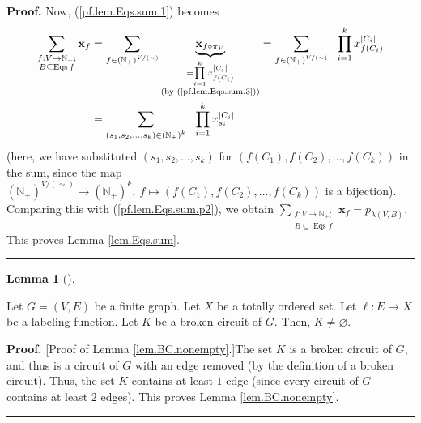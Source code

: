\documentclass[numbers=enddot,12pt,final,onecolumn,notitlepage]{scrartcl}%
\theoremstyle{definition}
\newtheorem{lem}[theo]{Lemma}
\newenvironment{lemma}[1][]
{\begin{lem}[#1]\begin{leftbar}}
{\end{leftbar}\end{lem}}
\newenvironment{proof}[1][Proof]{\noindent\textbf{#1.} }{\ \rule{0.5em}{0.5em}}
\newenvironment{verlong}{}{}
\newenvironment{vershort}{}{}
\let\sumnonlimits\sum
\let\prodnonlimits\prod
\renewcommand{\sum}{\sumnonlimits\limits}
\renewcommand{\prod}{\prodnonlimits\limits}
\begin{document}
\begin{verlong}
\begin{proof}
Now, (\ref{pf.lem.Eqs.sum.1}) becomes%
\begin{align*}
\sum_{\substack{f:V\rightarrow\mathbb{N}_{+};\\B\subseteq\operatorname*{Eqs}%
f}}\mathbf{x}_{f}  &  =\sum_{f\in\left(  \mathbb{N}_{+}\right)  ^{V/\left(
\sim\right)  }}\underbrace{\mathbf{x}_{f\circ\pi_{V}}}_{\substack{=\prod
_{i=1}^{k}x_{f\left(  C_{i}\right)  }^{\left\vert C_{i}\right\vert
}\\\text{(by (\ref{pf.lem.Eqs.sum.3}))}}}=\sum_{f\in\left(  \mathbb{N}%
_{+}\right)  ^{V/\left(  \sim\right)  }}\ \ \prod_{i=1}^{k}x_{f\left(
C_{i}\right)  }^{\left\vert C_{i}\right\vert }\\
&  =\sum_{\left(  s_{1},s_{2},\ldots,s_{k}\right)  \in\left(  \mathbb{N}%
_{+}\right)  ^{k}}\ \ \prod_{i=1}^{k}x_{s_{i}}^{\left\vert C_{i}\right\vert }%
\end{align*}
(here, we have substituted $\left(  s_{1},s_{2},\ldots,s_{k}\right)  $ for
$\left(  f\left(  C_{1}\right)  ,f\left(  C_{2}\right)  ,\ldots,f\left(
C_{k}\right)  \right)  $ in the sum, since the map $\left(  \mathbb{N}%
_{+}\right)  ^{V/\left(  \sim\right)  }\rightarrow\left(  \mathbb{N}%
_{+}\right)  ^{k},\ f\mapsto\left(  f\left(  C_{1}\right)  ,f\left(
C_{2}\right)  ,\ldots,f\left(  C_{k}\right)  \right)  $ is a bijection).
Comparing this with (\ref{pf.lem.Eqs.sum.p2}), we obtain $\sum
_{\substack{f:V\rightarrow\mathbb{N}_{+};\\B\subseteq\operatorname*{Eqs}%
f}}\mathbf{x}_{f}=p_{\lambda\left(  V,B\right)  }$. This proves Lemma
\ref{lem.Eqs.sum}.
\end{proof}
\end{verlong}

\begin{lemma}
\label{lem.BC.nonempty}Let $G=\left(  V,E\right)  $ be a finite graph. Let $X$
be a totally ordered set. Let $\ell:E\rightarrow X$ be a labeling function.
Let $K$ be a broken circuit of $G$. Then, $K\neq\varnothing$.
\end{lemma}

\begin{vershort}
\begin{proof}
[Proof of Lemma \ref{lem.BC.nonempty}.]The set $K$ is a broken circuit of $G$,
and thus is a circuit of $G$ with an edge removed (by the definition of a
broken circuit). Thus, the set $K$ contains at least $1$ edge (since every
circuit of $G$ contains at least $2$ edges). This proves Lemma
\ref{lem.BC.nonempty}.
\end{proof}
\end{vershort}
\end{document}

